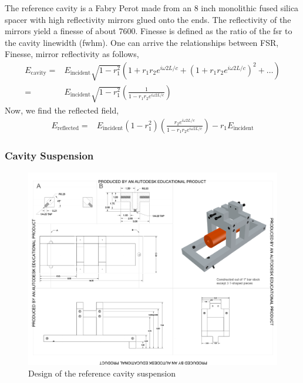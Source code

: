 The reference cavity is a Fabry Perot made from an 8 inch monolithic fused silica
spacer with high reflectivity mirrors glued onto the ends. The reflectivity
of the mirrors yield a finesse of about 7600. Finesse is defined as the ratio
of the \ac{fsr} to the cavity linewidth (\ac{fwhm}). One can arrive the
relationships between FSR, Finesse, mirror reflectivity as follows,
\begin{align}
E_{\mathrm{cavity}} =& E_{\mathrm{incident}} \sqrt{1-r_1^2} \left( 1 + r_1 r_2
    e^{i \omega 2 L /c} + \left(1+r_1 r_2 e^{i \omega 2L/c} \right)^2 + \ldots \right)
    \\
=& E_{\mathrm{incident}} \sqrt{1-r_1^2} \left( \frac{1}{1 - r_1 r_2
    e^{i \omega 2L/c}} \right)
\end{align}
Now, we find the reflected field,
\begin{align}
E_{\mathrm{reflected}} =& E_{\mathrm{incident}} \left( 1-r_1^2 \right)
    \left( \frac{r_2 e^{i \omega 2L/c}}{1 - r_1 r_2 e^{i \omega 2L/c}} \right)
    - r_1 E_{\mathrm{incident}}
\end{align}

\subsubsection{Cavity Suspension}
\begin{figure}[htbp]
	\centering
		\includegraphics[width=15cm]{./figures/refcavsusdesign.pdf}
	\caption[Reference Cavity Suspension Design]{Design of the reference cavity suspension}
	\label{fig:refcav_sus}
\end{figure}

